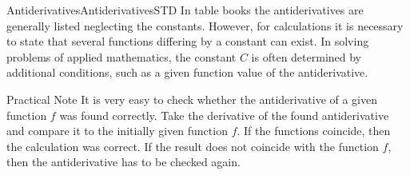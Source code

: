 \begin{MXContent}{Antiderivatives}{Antiderivatives}{STD}
In table books the antiderivatives are generally listed neglecting the constants. 
However, for calculations it is necessary to state that several functions differing 
by a constant can exist. In solving problems of applied mathematics, the constant $C$ is often 
determined by additional conditions, such as a given function value 
of the antiderivative.
%


\begin{MXInfo}{Practical Note}
It is very easy to check whether the antiderivative of a given function $f$ was 
found correctly. Take the derivative of the found antiderivative and compare
it to the initially given function $f$. If the functions coincide, then the 
calculation was correct. If the result does not coincide with the function $f$, then 
the antiderivative has to be checked again.
\end{MXInfo}
\end{MXContent}



